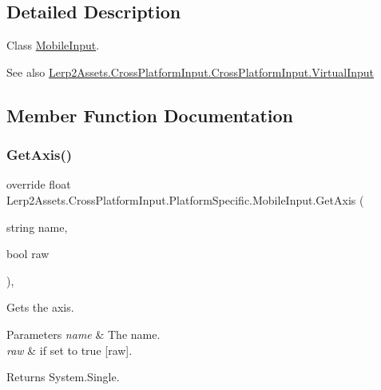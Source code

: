\subsection{Detailed Description}
Class \hyperlink{class_lerp2_assets_1_1_cross_platform_input_1_1_platform_specific_1_1_mobile_input}{Mobile\+Input}. 

\begin{DoxySeeAlso}{See also}
\hyperlink{class_lerp2_assets_1_1_cross_platform_input_1_1_cross_platform_input_1_1_virtual_input}{Lerp2\+Assets.\+Cross\+Platform\+Input.\+Cross\+Platform\+Input.\+Virtual\+Input}


\end{DoxySeeAlso}


\subsection{Member Function Documentation}
\mbox{\label{class_lerp2_assets_1_1_cross_platform_input_1_1_platform_specific_1_1_mobile_input_a4bcf5ea3b75e24eba7c21b9a6cae3778}} 
\subsubsection{\texorpdfstring{Get\+Axis()}{GetAxis()}}
{\footnotesize\ttfamily override float Lerp2\+Assets.\+Cross\+Platform\+Input.\+Platform\+Specific.\+Mobile\+Input.\+Get\+Axis (\begin{DoxyParamCaption}\item[{string}]{name,  }\item[{bool}]{raw }\end{DoxyParamCaption})\hspace{0.3cm}{\ttfamily [inline]}, {\ttfamily [virtual]}}



Gets the axis. 


\begin{DoxyParams}{Parameters}
{\em name} & The name.\\
\hline
{\em raw} & if set to {\ttfamily true} \mbox{[}raw\mbox{]}.\\
\hline
\end{DoxyParams}
\begin{DoxyReturn}{Returns}
System.\+Single.
\end{DoxyReturn}



